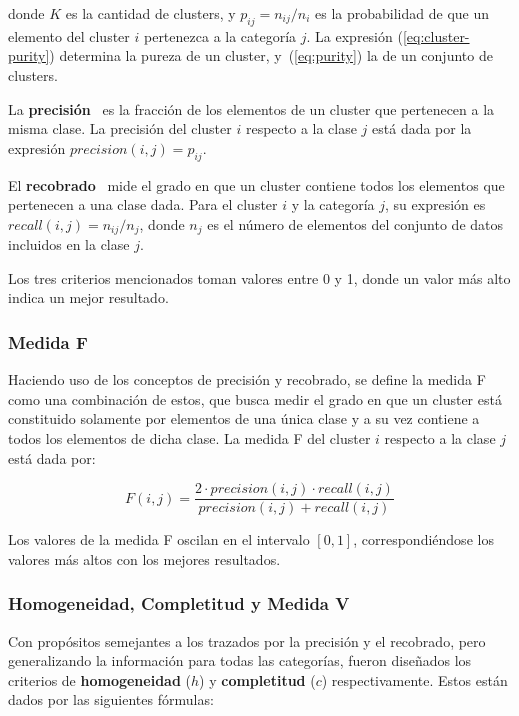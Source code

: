 \noindent
donde $K$ es la cantidad de clusters, y $p_{ij} = n_{ij}/n_i$ es la probabilidad de que un elemento del cluster $i$ pertenezca a la categoría $j$.
La expresión (\ref{eq:cluster-purity}) determina la pureza de un cluster, y~(\ref{eq:purity}) la de un conjunto de clusters.

La \textbf{precisión}~\cite{Tan05,Aggarawal13} es la fracción de los elementos de un cluster que pertenecen a la misma clase.
La precisión del cluster $i$ respecto a la clase $j$ está dada por la expresión $precision(i,j) = p_{ij}$.

El \textbf{recobrado}~\cite{Tan05,Aggarawal13} mide el grado en que un cluster contiene todos los elementos que pertenecen a una clase dada.
Para el cluster $i$ y la categoría $j$, su expresión es $recall(i,j) = n_{ij}/n_j$, donde $n_j$ es el número de elementos del conjunto de datos incluidos en la clase $j$.

Los tres criterios mencionados toman valores entre 0 y 1, donde un valor más alto indica un mejor resultado.

\subsubsection{Medida F}

Haciendo uso de los conceptos de precisión y recobrado, se define la medida F~\cite{Tan05,Aggarawal13,Wagner07} como una combinación de estos, que busca medir el grado en que un cluster está constituido solamente por elementos de una única clase y a su vez contiene a todos los elementos de dicha clase.
La medida F del cluster $i$ respecto a la clase $j$ está dada por:

\begin{equation}
    \label{eq:F-measure}
    F(i,j) = \frac{2 \cdot precision(i,j) \cdot recall(i,j)}{precision(i,j) + recall(i,j)}
\end{equation}

Los valores de la medida F oscilan en el intervalo $[0,1]$, correspondiéndose los valores más altos con los mejores resultados.

\subsubsection{Homogeneidad, Completitud y Medida V}

Con propósitos semejantes a los trazados por la precisión y el recobrado, pero generalizando la información para todas las categorías, fueron diseñados los criterios de \textbf{homogeneidad} ($h$) y \textbf{completitud} ($c$) respectivamente.
Estos están dados por las siguientes fórmulas:

